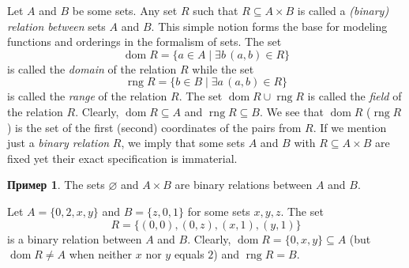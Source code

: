 \documentclass[12pt,notitlepage]{article}
\theoremstyle{plain}
\theoremstyle{definition}
\newtheorem{exm}[thm]{Пример}
\theoremstyle{plain}
\newcommand{\sbs}{\subseteq}
\newcommand{\void}{\varnothing}
\newcommand{\dom}{\mathop{\mathrm{dom}}}
\newcommand{\rng}{\mathop{\mathrm{rng}}}
\newcommand{\1}{\mathbf{1}}
\newcommand{\0}{\mathbf{0}}
\newcommand{\mcomm}[1]{}
\begin{document}
Let $A$ and $B$ be some sets. Any set $R$ such that $R \sbs A \times B$ is called a \emph{(binary) relation between} sets $A$ and $B$. This simple notion forms the base for modeling functions and orderings in the formalism of sets. The set
$$\dom R = \{a \in A \mid \exists b\, (a, b) \in R \}$$
is called the \emph{domain} of the relation $R$ while the set
$$\rng R = \{b \in B \mid \exists a\, (a, b) \in R \}$$
is called the \emph{range} of the relation $R$. The set $\dom R \cup \rng R$ is called the \emph{field} of the relation $R$. Clearly, $\dom R \sbs A$ and $\rng R \sbs B$. We see that $\dom R$ ($\rng R$) is the set of the first (second) coordinates of the pairs from $R$. If we mention just a \emph{binary relation} $R$, we imply that some sets $A$ and $B$ with $R \sbs A \times B$ are fixed yet their exact specification is immaterial.

\mcomm{We prefer this `parametric' definition to the more natural one (where every set $R$ of ordered pairs is called a relation) since the latter would require taking ${\cup} {\cup} R$ for the relation's field, whereas we want to avoid infinite unions generally.}

\begin{exm}\label{rel:exm_rel}
	The sets $\void$ and $A \times B$ are binary relations between $A$ and $B$.
	
	Let $A = \{0,2, x, y\}$ and $B = \{z, 0, 1\}$ for some sets $x, y, z$. The set
	$$R = \{ (0, 0), (0,z), (x, 1), (y,1) \}$$
	is a binary relation between $A$ and $B$. Clearly, $\dom R = \{0,x,y\} \sbs A$ (but $\dom R \neq A$ when neither $x$ nor $y$ equals $2$) and $\rng R = B$.
\end{exm}
\end{document}
